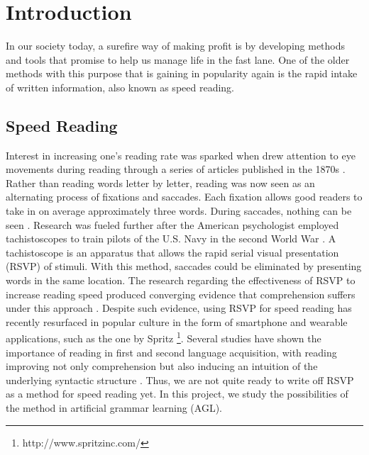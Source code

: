\section{Introduction}
In our society today, a surefire way of making profit is by developing methods and tools that promise to help us manage life in the fast lane. One of the older methods with this purpose that is gaining in popularity again is the rapid intake of written information, also known as speed reading.
\subsection{Speed Reading} 
Interest in increasing one's reading rate was sparked when \citeauthor{javal1879essai} drew attention to eye movements during reading through a series of articles published in the 1870s \citep{javal1879essai, huey1908psychology, wade2009did}. Rather than reading words letter by letter, reading was now seen as an alternating process of fixations and saccades. Each fixation allows good readers to take in on average approximately three words. During saccades, nothing can be seen \citep{ahuja1995increase}. Research was fueled further after the American psychologist \citeauthor{renshaw1945visual} employed tachistoscopes to train pilots of the U.S. Navy in the second World War \citep{godnig2003tachi, benschop1998tachistoscope, renshaw1945visual}. A tachistoscope is an apparatus that allows the rapid serial visual presentation (RSVP) of stimuli. With this method, saccades could be eliminated by presenting words in the same location. 
The research regarding the effectiveness of RSVP to increase reading speed produced converging evidence that comprehension suffers under this approach \citep{swalm1973speed, witty1969rate, causey1954colleges, bormuth1961tachistoscope, mcconkie1973experimental, schotter2014don}. Despite such evidence, using RSVP for speed reading has recently resurfaced in popular culture in the form of smartphone and wearable applications, such as the one by Spritz \footnote{http://www.spritzinc.com/}. Several studies have shown the importance of reading in first and second language acquisition, with reading improving not only comprehension but also inducing an intuition of the underlying syntactic structure \citep{chomsky1972stages, siegel1988development,krashen1993power}. Thus, we are not quite ready to write off RSVP as a method for speed reading yet. In this project, we study the possibilities of the method in artificial grammar learning (AGL).


